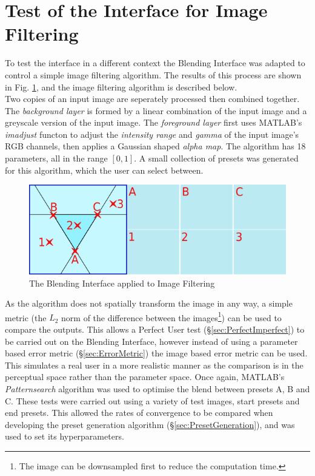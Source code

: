 \documentclass[11pt, oneside]{report}   	%
\begin{document}
\section{Test of the Interface for Image Filtering}\label{sec:ImageEditing}
To test the interface in a different context the Blending Interface was adapted to control a simple image filtering algorithm. The results of this process are shown in Fig. \ref{fig:ImageFIltering}, and the image filtering algorithm is described below.\\
Two copies of an input image are seperately processed then combined together. The \emph{background layer} is formed by a linear combination of the input image and a greyscale version of the input image. The \emph{foreground layer} first uses MATLAB's \emph{imadjust} functon to adjust the \emph{intensity range} and \emph{gamma} of the input image's RGB channels, then applies a Gaussian shaped \emph{alpha map}. The algorithm has 18 parameters, all in the range $[0,1]$. A small collection of presets was generated for this algorithm, which the user can select between.
\begin{figure}[h]
	\hspace{-30pt}
	\includegraphics[width = 7in]{ImageBlendingLocations.png}
	\caption{The Blending Interface applied to Image Filtering}
	\label{fig:ImageFIltering}
	\vspace{-20pt}
\end{figure}

As the algorithm does not spatially transform the image in any way, a simple metric (the $L_2$ norm of the difference between the images\footnote{The image can be downsampled first to reduce the computation time.}) can be used to compare the outputs. This allows a Perfect User test (\S \ref{sec:PerfectImperfect}) to be carried out on the Blending Interface, however instead of using a parameter based error metric (\S \ref{sec:ErrorMetric}) the image based error metric can be used. This simulates a real user in a more realistic manner as the comparison is in the perceptual space rather than the parameter space. Once again, MATLAB's \emph{Patternsearch} algorithm was used to optimise the blend between presets A, B and C. These tests were carried out using a variety of test images, start presets and end presets. This allowed the rates of convergence to be compared when developing the preset generation algorithm (\S \ref{sec:PresetGeneration}), and was used to set its hyperparameters.
\end{document}
